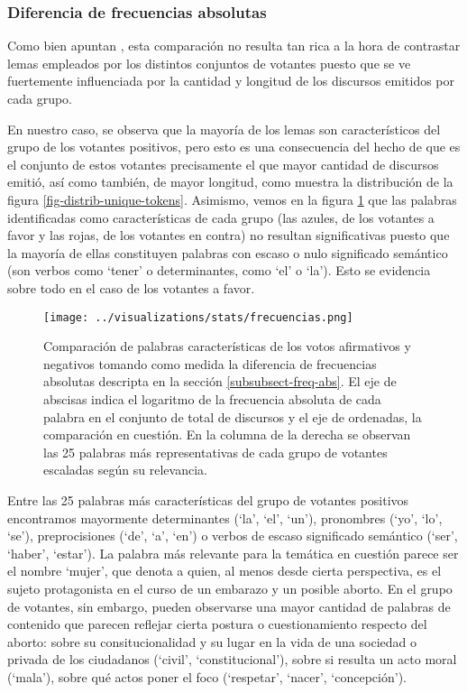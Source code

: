 \subsubsection{Diferencia de frecuencias absolutas}
Como bien apuntan \cite{monroe2008fightin}, esta comparación no resulta tan rica
a la hora de contrastar lemas empleados por los distintos conjuntos de
votantes puesto que se ve fuertemente influenciada por la cantidad y longitud
de los discursos emitidos por cada grupo.
\par
En nuestro caso, se observa que la mayor\'ia de los lemas son característicos
del grupo de los votantes positivos, pero esto es una consecuencia del hecho
de que es el conjunto de estos votantes precisamente el que mayor cantidad de
discursos emitió, así como también, de mayor longitud, como muestra la distribución
de la figura \ref{fig-distrib-unique-tokens}. Asimismo, vemos en la figura
\ref{fig-statistics-freq-abs} que las palabras identificadas como características
de cada grupo (las azules, de los votantes a favor y las rojas, de los votantes
en contra) no resultan significativas puesto que la mayoría de ellas constituyen
palabras con escaso o nulo significado semántico (son verbos como `tener' o
determinantes, como `el' o `la'). Esto se evidencia sobre todo en el caso de
los votantes a favor.

\begin{figure}[h!]
    \centering
    \texttt{[image: ../visualizations/stats/frecuencias.png]}
    \caption{Comparación de palabras características de los votos afirmativos y
    negativos tomando como medida la diferencia de frecuencias absolutas descripta
    en la sección \ref{subsubsect-freq-abs}. El eje de abscisas indica el logaritmo
    de la frecuencia absoluta de cada palabra en el conjunto de total de discursos
    y el eje de ordenadas, la comparación en cuestión. En la columna de la
    derecha se observan las 25 palabras más representativas de cada grupo de
    votantes escaladas según su relevancia.}
    \label{fig-statistics-freq-abs}
\end{figure}

Entre las 25 palabras más características del grupo de votantes positivos
encontramos mayormente determinantes (`la', `el', `un'), pronombres 
(`yo', `lo', `se'), preprocisiones (`de', `a', `en') o verbos de escaso
significado semántico (`ser', `haber', `estar'). La palabra más relevante
para la temática en cuestión parece ser el nombre `mujer', que denota a
quien, al menos desde cierta perspectiva, es el
sujeto protagonista en el curso de un embarazo y un posible aborto. En el grupo
de votantes, sin embargo, pueden observarse una mayor cantidad de palabras
de contenido que parecen reflejar cierta
postura o cuestionamiento respecto del aborto: sobre su consitucionalidad
y su lugar en la vida de una sociedad o privada de los ciudadanos
(`civil', `constitucional'), sobre si resulta un acto moral (`mala'),
sobre qué actos poner el foco (`respetar', `nacer', `concepción').

